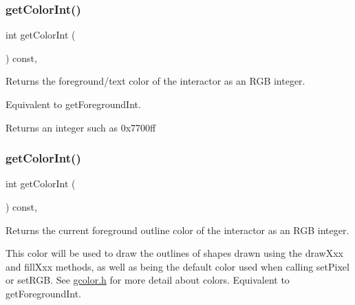 \subsubsection{\texorpdfstring{get\+Color\+Int()}{getColorInt()}\hspace{0.1cm}{\footnotesize\ttfamily [1/2]}}
{\footnotesize\ttfamily int get\+Color\+Int (\begin{DoxyParamCaption}{ }\end{DoxyParamCaption}) const\hspace{0.3cm}{\ttfamily [virtual]}, {\ttfamily [inherited]}}



Returns the foreground/text color of the interactor as an R\+GB integer. 

Equivalent to get\+Foreground\+Int. \begin{DoxyReturn}{Returns}
an integer such as 0x7700ff 
\end{DoxyReturn}
\mbox{\label{classsgl_1_1GDrawingSurface_a9635c7af766cdc3417f346683fa0e6c1}} 
\subsubsection{\texorpdfstring{get\+Color\+Int()}{getColorInt()}\hspace{0.1cm}{\footnotesize\ttfamily [2/2]}}
{\footnotesize\ttfamily int get\+Color\+Int (\begin{DoxyParamCaption}{ }\end{DoxyParamCaption}) const\hspace{0.3cm}{\ttfamily [virtual]}, {\ttfamily [inherited]}}



Returns the current foreground outline color of the interactor as an R\+GB integer. 

This color will be used to draw the outlines of shapes drawn using the draw\+Xxx and fill\+Xxx methods, as well as being the default color used when calling set\+Pixel or set\+R\+GB. See \mbox{\hyperlink{gcolor_8h_source}{gcolor.\+h}} for more detail about colors. Equivalent to get\+Foreground\+Int. \mbox{\label{classsgl_1_1GInteractor_a7a6e317c29d61030929b4cd2d1c00fe7}} 

